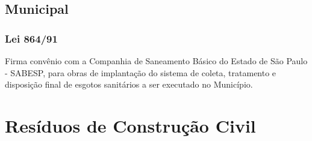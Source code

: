 \begin{subapend}
	\subsection{Municipal}
	\begin{subsubapend}
		\item \subsubsection{Lei 864/91}
		Firma convênio com a Companhia de Saneamento Básico do Estado de São Paulo - SABESP, para obras de implantação do sistema de coleta, tratamento e disposição final de esgotos sanitários a ser executado no Município.
	\end{subsubapend}
\end{subapend}



\section{Resíduos de Construção Civil}
